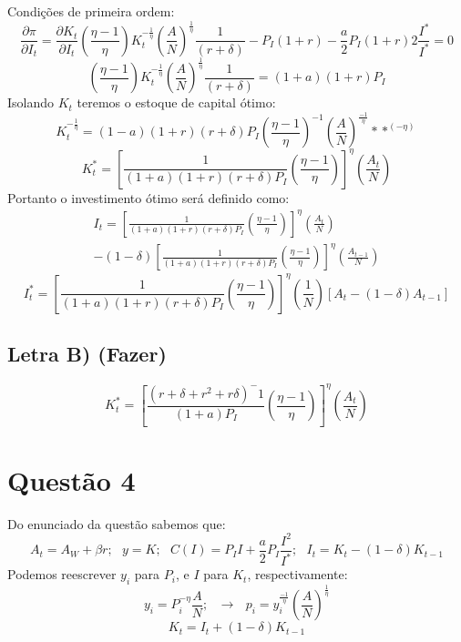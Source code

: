 \documentclass{article}
\begin{document}
Condições de primeira ordem:
\begin{equation}
    \frac{\partial \pi}{\partial I_t} = \frac{\partial K_t}{\partial I_t} \left(\frac{\eta-1}{\eta}\right)K_t^{-\frac{1}{\eta}}\left(\frac{A}{N}\right)^\frac{1}{\eta}\frac{1}{(r+\delta)}-
    P_I(1+r)-\frac{a}{2}P_I(1+r)2\frac{I^*}{I^*} = 0 
\end{equation}
\begin{equation}
    \left(\frac{\eta-1}{\eta}\right)K_t^{-\frac{1}{\eta}}\left(\frac{A}{N}\right)^\frac{1}{\eta}\frac{1}{(r+\delta)}=(1+a)(1+r)P_I
\end{equation}
Isolando $K_t$ teremos o estoque de capital ótimo:
\begin{equation}
    K_t^{-\frac{1}{\eta}}=(1-a)(1+r)(r+\delta)P_I\left(\frac{\eta-1}{\eta}\right)^{-1}\left(\frac{A}{N}\right)^\frac{-1}{\eta} **^{(-\eta)}
\end{equation}
\begin{equation}
    K_t^*=\left[\frac{1}{(1+a)(1+r)(r+\delta)P_I} \left(\frac{\eta-1}{\eta}\right)\right]^{\eta}\left(\frac{A_t}{N}\right)
\end{equation}
Portanto o investimento ótimo será definido como:
\begin{equation}
\begin{split}
    I_t = \left[\frac{1}{(1+a)(1+r)(r+\delta)P_I} \left(\frac{\eta-1}{\eta}\right)\right]^{\eta}\left(\frac{A_t}{N}\right) \\ - (1-\delta)\left[\frac{1}{(1+a)(1+r)(r+\delta)P_I} \left(\frac{\eta-1}{\eta}\right)\right]^{\eta}\left(\frac{A_{t-1}}{N}\right)
\end{split}
\end{equation}
\begin{equation}
    I_t^* = \left[\frac{1}{(1+a)(1+r)(r+\delta)P_I} \left(\frac{\eta-1}{\eta}\right)\right]^{\eta}\left(\frac{1}{N}\right)[A_t- (1-\delta)A_{t-1}]
\end{equation}

\subsection*{Letra B) (Fazer)}
\begin{equation}
K_t^*=\left[\frac{(r+\delta+r^2+r\delta)^-1}{(1+a)P_I} \left(\frac{\eta-1}{\eta}\right)\right]^{\eta}\left(\frac{A_t}{N}\right)
\end{equation}

\section*{Questão 4}
Do enunciado da questão sabemos que:
$$A_t = A_W + \beta r; \>\>\> y=K; \>\>\>  C(I) = P_I I + \frac{a}{2}P_I \frac{I^2}{I^*}; \>\>\> I_t = K_t - (1-\delta)K_{t-1} $$
Podemos reescrever $y_i$ para $P_i$, e $I$ para $K_t$, respectivamente:
$$y_i=P_i^{-\eta}\frac{A}{N}; \>\>\> \to  \>\>\> p_i=y_i^{\frac{-1}{\eta}}\left(\frac{A}{N}\right)^\frac{1}{\eta}$$
\begin{equation}\label{eq:4capital}
    K_t=I_t +(1-\delta)K_{t-1}
\end{equation}
\end{document}
